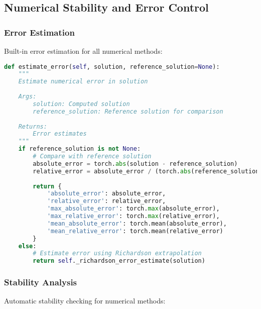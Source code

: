 \subsection{Numerical Stability and Error Control}

\subsubsection{Error Estimation}

Built-in error estimation for all numerical methods:

\begin{lstlisting}[language=Python, caption=Error Estimation]
def estimate_error(self, solution, reference_solution=None):
    """
    Estimate numerical error in solution
    
    Args:
        solution: Computed solution
        reference_solution: Reference solution for comparison
    
    Returns:
        Error estimates
    """
    if reference_solution is not None:
        # Compare with reference solution
        absolute_error = torch.abs(solution - reference_solution)
        relative_error = absolute_error / (torch.abs(reference_solution) + 1e-12)
        
        return {
            'absolute_error': absolute_error,
            'relative_error': relative_error,
            'max_absolute_error': torch.max(absolute_error),
            'max_relative_error': torch.max(relative_error),
            'mean_absolute_error': torch.mean(absolute_error),
            'mean_relative_error': torch.mean(relative_error)
        }
    else:
        # Estimate error using Richardson extrapolation
        return self._richardson_error_estimate(solution)
\end{lstlisting}

\subsubsection{Stability Analysis}

Automatic stability checking for numerical methods:

